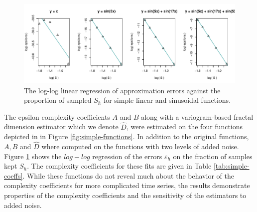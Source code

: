   \begin{figure}[h]
    \begin{center}
    \includegraphics[width = \textwidth, keepaspectratio]
    {./figs/coeff-interp-simple-fits.pdf}
    \end{center}
    \caption{The log-log linear regression
     of approximation errors against the
     proportion of sampled $S_h$ for simple 
     linear and sinusoidal functions.}
    \label{fig:simple-fits}
  \end{figure}



The epsilon complexity coefficients $A$ and $B$ along with 
a variogram-based fractal dimension estimator which 
we denote $\hat D$, were estimated on the four 
functions depicted in in Figure \ref{fig:simple-functions}. 
In addition to the original functions, $A,B$ and $\hat D$ where 
computed on the functions with two levels of added noise. 
Figure \ref{fig:simple-fits} 
shows the $log-log$ regression of the errors $\varepsilon_h$ 
on the fraction of samples kept $S_h$. The complexity coefficients for these fits are given in Table \ref{tab:simple-coeffs}. While these functions do not reveal much about the behavior of the complexity coefficients for more complicated time series, the results
demonstrate properties of the complexity coefficients and 
the sensitivity of the estimators to added noise.

